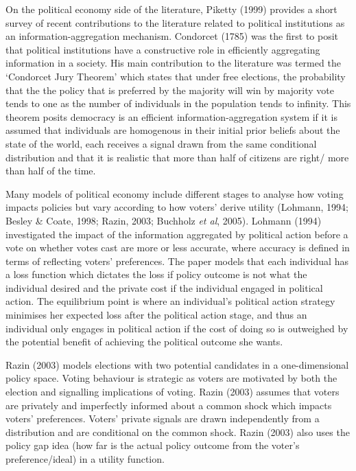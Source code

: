 \documentclass[11pt,preprint, authoryear]{elsarticle}
\numberwithin{equation}{section}
\numberwithin{figure}{section}
\numberwithin{table}{section}
\begin{document}
On the political economy side of the literature, Piketty (1999) provides
a short survey of recent contributions to the literature related to
political institutions as an information-aggregation mechanism.
Condorcet (1785) was the first to posit that political institutions have
a constructive role in efficiently aggregating information in a society.
His main contribution to the literature was termed the `Condorcet Jury
Theorem' which states that under free elections, the probability that
the the policy that is preferred by the majority will win by majority
vote tends to one as the number of individuals in the population tends
to infinity. This theorem posits democracy is an efficient
information-aggregation system if it is assumed that individuals are
homogenous in their initial prior beliefs about the state of the world,
each receives a signal drawn from the same conditional distribution and
that it is realistic that more than half of citizens are right/ more
than half of the time.

Many models of political economy include different stages to analyse how
voting impacts policies but vary according to how voters' derive utility
(Lohmann, 1994; Besley \& Coate, 1998; Razin, 2003; Buchholz \emph{et
al}, 2005). Lohmann (1994) investigated the impact of the information
aggregated by political action before a vote on whether votes cast are
more or less accurate, where accuracy is defined in terms of reflecting
voters' preferences. The paper models that each individual has a loss
function which dictates the loss if policy outcome is not what the
individual desired and the private cost if the individual engaged in
political action. The equilibrium point is where an individual's
political action strategy minimises her expected loss after the
political action stage, and thus an individual only engages in political
action if the cost of doing so is outweighed by the potential benefit of
achieving the political outcome she wants.

Razin (2003) models elections with two potential candidates in a
one-dimensional policy space. Voting behaviour is strategic as voters
are motivated by both the election and signalling implications of
voting. Razin (2003) assumes that voters are privately and imperfectly
informed about a common shock which impacts voters' preferences. Voters'
private signals are drawn independently from a distribution and are
conditional on the common shock. Razin (2003) also uses the policy gap
idea (how far is the actual policy outcome from the voter's
preference/ideal) in a utility function.
\end{document}

